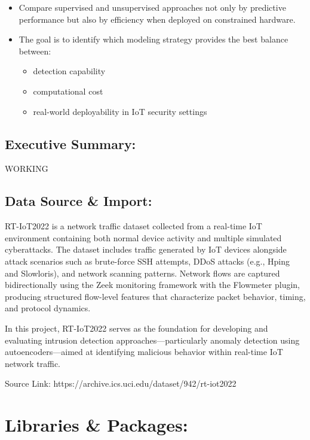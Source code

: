 \documentclass[
  letterpaper,
  DIV=11,
  numbers=noendperiod]{scrartcl}
\begin{document}
\begin{enumerate}
  \begin{itemize}
  \item
    Compare supervised and unsupervised approaches not only by
    predictive performance but also by efficiency when deployed on
    constrained hardware.
  \item
    The goal is to identify which modeling strategy provides the best
    balance between:

    \begin{itemize}
    \item
      detection capability
    \item
      computational cost
    \item
      real-world deployability in IoT security settings
    \end{itemize}
  \end{itemize}
\end{enumerate}

\subsection{Executive Summary:}\label{executive-summary}

WORKING

\subsection{Data Source \& Import:}\label{data-source-import}

RT-IoT2022 is a network traffic dataset collected from a real-time IoT
environment containing both normal device activity and multiple
simulated cyberattacks. The dataset includes traffic generated by IoT
devices alongside attack scenarios such as brute-force SSH attempts,
DDoS attacks (e.g., Hping and Slowloris), and network scanning patterns.
Network flows are captured bidirectionally using the Zeek monitoring
framework with the Flowmeter plugin, producing structured flow-level
features that characterize packet behavior, timing, and protocol
dynamics.

In this project, RT-IoT2022 serves as the foundation for developing and
evaluating intrusion detection approaches---particularly anomaly
detection using autoencoders---aimed at identifying malicious behavior
within real-time IoT network traffic.

Source Link: https://archive.ics.uci.edu/dataset/942/rt-iot2022

\section{Libraries \& Packages:}\label{libraries-packages}
\end{document}
